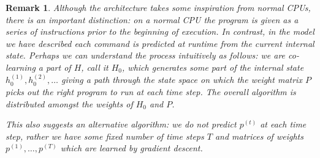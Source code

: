 \documentclass[english,letter paper,12pt,leqno]{article}
\theoremstyle{example}
\newtheorem{remark}[theorem]{Remark}
\numberwithin{equation}{section}
\begin{document}
\begin{remark} Although the architecture takes some inspiration from normal CPUs, there is an important distinction: on a normal CPU the program is given as a series of instructions prior to the beginning of execution. In contrast, in the model we have described each command is \emph{predicted} at runtime from the current internal state. Perhaps we can understand the process intuitively as follows: we are co-learning a part of $H$, call it $H_0$, which generates some part of the internal state $h^{(1)}_{0}, h^{(2)}_{0}, \ldots$ giving a path through the state space on which the weight matrix $P$ picks out the right program to run at each time step. The overall algorithm is distributed amongst the weights of $H_0$ and $P$.

This also suggests an alternative algorithm: we do not predict $p^{(t)}$ at each time step, rather we have some fixed number of time steps $T$ and matrices of weights $p^{(1)}, \ldots, p^{(T)}$ which are learned by gradient descent.
\end{remark}
\end{document}
